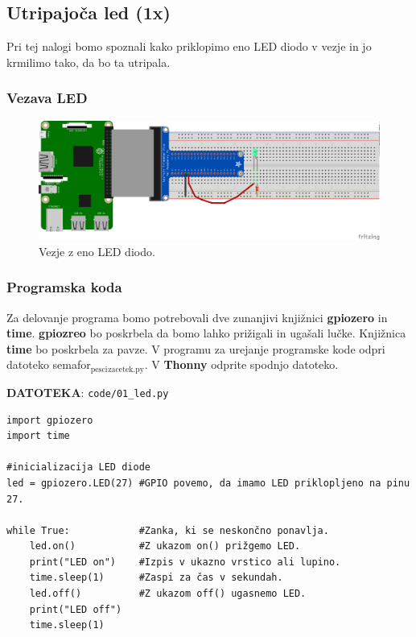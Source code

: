 \documentclass[11pt]{article}
\begin{document}
\subsection{Utripajoča led (1x)}
\label{sec:org974b864}
Pri tej nalogi bomo spoznali kako priklopimo eno LED diodo v vezje in jo
krmilimo tako, da bo ta utripala. 
\subsubsection{Vezava LED}
\label{sec:orgb6fdc8c}
\begin{figure}[htbp]
\centering
\includegraphics[width=.9\linewidth]{breadboard/REB_1LED.png}
\caption{\label{fig:orgbb0710a}
Vezje z eno LED diodo.}
\end{figure}

\subsubsection{Programska koda}
\label{sec:org6667134}
Za delovanje programa bomo potrebovali dve zunanjivi knjižnici \textbf{gpiozero} in
\textbf{time}. \textbf{gpiozreo} bo poskrbela da bomo lahko prižigali in ugašali lučke.
Knjižnica \textbf{time} bo poskrbela za pavze. V programu za urejanje programske
kode odpri datoteko semafor\(_{\text{pesci}}\)\(_{\text{zacetek.py}}\). V \textbf{Thonny} odprite spodnjo
datoteko.

\textbf{DATOTEKA}: \texttt{code/01\_led.py}

\begin{verbatim}
import gpiozero
import time

#inicializacija LED diode 
led = gpiozero.LED(27) #GPIO povemo, da imamo LED priklopljeno na pinu 27.

while True:            #Zanka, ki se neskončno ponavlja.
    led.on()           #Z ukazom on() prižgemo LED.
    print("LED on")    #Izpis v ukazno vrstico ali lupino.
    time.sleep(1)      #Zaspi za čas v sekundah.
    led.off()          #Z ukazom off() ugasnemo LED.
    print("LED off")
    time.sleep(1)
\end{verbatim}
\end{document}
